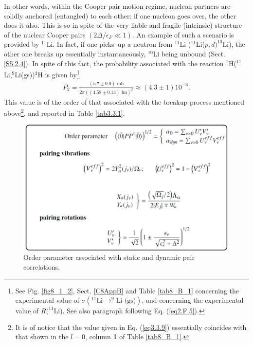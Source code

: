 In other words, within the Cooper pair motion regime, nucleon partners are solidly anchored (entangled) to each other: if one nucleon goes over, the other does it also. This is so in spite of the very liable and fragile (intrinsic) structure of the nuclear Cooper pairs $(2\Delta/\epsilon_F\ll1)$. An example of such a  scenario is  provided by $^{11}$Li. In fact, if one picks--up a neutron from $^{11}$Li ($^{11}$Li($p,d)^{10}$Li), the other one breaks up essentially instantaneously, $^{10}$Li being unbound (Sect. \ref{S5.2.4}). In spite of this fact, the probability associated with the reaction $^1$H($^{11}$Li,$^9$Li(gs))$^{3}$H is given by\footnote{See  Fig. \ref{fig8_1_2}, Sect. \ref{C8AppB} and Table \ref{tab8_B_1} concerning the experimental value of \mbox{$\sigma(^{11}\text{Li}\to ^{9}\text{Li (gs)})$}, and \cite{Kobayashi:89} concerning the experimental value of $R(^{11}$Li). See also paragraph following Eq. (\ref{eq2.F.5}).}
\begin{align}\label{eq3.3.9}
P_2=\frac{(5.7\pm0.9)\text{ mb}}{2\pi((4.58\pm0.13)\text{ fm})^2}\approx(4.3\pm1)10^{-3}.
\end{align}
This value is of the order of that associated with the breakup process mentioned above\footnote{It is of notice that the value given in Eq. (\ref{eq3.3.9}) essentially coincides with that shown in the $l=0$, column \textbf{1} of  Table \ref{tab8_B_1}.}, and reported in  Table \ref{tab3.3.1}.
\begin{figure}
\centerline{\includegraphics*[width=15cm,angle=0]{nutshell/figs/fig3_3_2.pdf}}
\caption{Order parameter associated with static and dynamic pair correlations.}\label{fig3.3.2}
\end{figure}
